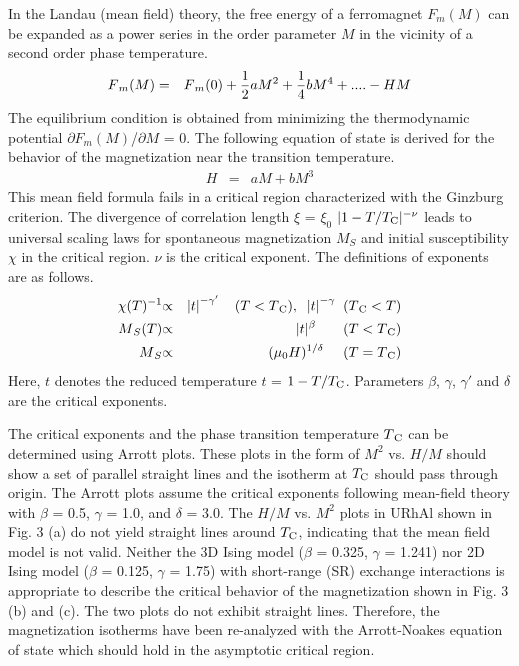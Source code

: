 \documentclass[twocolumn,showpacs,preprintnumbers,amsmath,amssymb]{revtex4}
\begin{document}
  In the Landau (mean field) theory, the free energy of a ferromagnet ${F_m}(M)$ can be expanded as a power series in the order parameter $M$ in the vicinity of a second order phase temperature.
     \begin{eqnarray}
 F{_m}(M)&=&F{_m}(0)+ {1\over 2}aM^2+{1\over 4}bM^4 +....-HM 
  \end{eqnarray}
 The equilibrium condition is obtained from minimizing the thermodynamic potential ${\partial F{_m}}(M)$/${\partial M}$ = 0. The following equation of state is derived for the behavior of the magnetization near the transition temperature. 
      \begin{eqnarray}
H&=&aM+bM^3 
  \end{eqnarray}
 This mean field formula fails in a critical region characterized with the Ginzburg criterion\cite{ginzburg2}. The divergence of correlation length $\xi$ = ${\xi}_0$ $|1-T/{T_{\rm C}}|^{-{\nu}}$ leads to universal scaling laws for spontaneous magnetization $M_S$ and initial susceptibility ${\chi}$ in the critical region. ${{\nu}}$ is the critical exponent. The definitions of exponents are as follows\cite{privman}.   
      \begin{eqnarray}
   {{\chi}}(T){^{-1}}&{\propto}&  {|t|}^{-{{\gamma}}'} {\;}{\;}{\;}{\;}(T<T{_{\rm C}}), {\;}{\;} {|t|}^{-{{\gamma}}} {\;}{\;}(T{_{\rm C}}< T)\\ 
 M{_S}(T) &{\propto}& |t|{^{\beta}}  {\;}  {\;} {\;}{\;}{\;} {\;}{\;}(T < T{_{\rm C}})\\ 
 {M{_S}}& {\propto} & ({{\mu}_0}H)^{1/{\delta}}   {\;} {\;} {\;}{\;}{\;} (T = T{_{\rm C}})
   \end{eqnarray}        
 Here, $t$ denotes the reduced temperature $t$ = $1-{T}/{T_{\rm C}}$. Parameters $\beta$, $\gamma$, ${\gamma}'$  and $\delta$ are the critical exponents. 
 
 The critical exponents and the phase transition temperature $T{_{\rm C}}$ can be determined using Arrott plots. These plots in the form of $M^2$ vs. $H/M$ should show a set of parallel straight lines and the isotherm at $T_{\rm C}$ should pass through origin\cite{privman}. The Arrott plots assume the critical exponents following mean-field theory with $\beta$ = 0.5, $\gamma$ = 1.0, and $\delta$ = 3.0. The $H/M$ vs. $M^2$ plots in URhAl shown in Fig. 3 (a) do not yield straight lines around $T_{\rm C}$, indicating that the mean field model is not valid. Neither the 3D Ising model ($\beta$ = 0.325, $\gamma$ = 1.241) nor 2D Ising model ($\beta$ = 0.125, $\gamma$ = 1.75) with short-range (SR) exchange interactions is appropriate to describe the critical behavior of the magnetization shown in Fig. 3 (b) and (c). The two plots do not exhibit straight lines. Therefore, the magnetization isotherms have been re-analyzed with the Arrott-Noakes equation of state which should hold in the asymptotic critical region\cite{arrott}.
\end{document}
